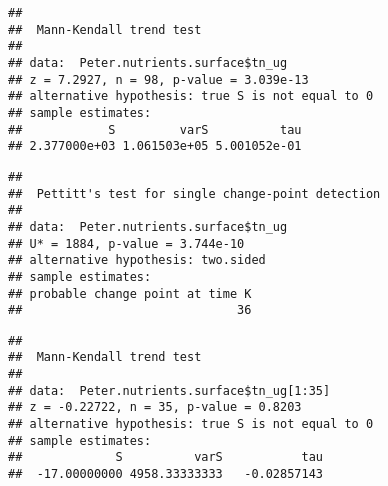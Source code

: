 \documentclass[]{article}
\newenvironment{Shaded}{\begin{snugshade}}{\end{snugshade}}
\newcommand{\KeywordTok}[1]{\textcolor[rgb]{0.13,0.29,0.53}{\textbf{#1}}}
\newcommand{\DecValTok}[1]{\textcolor[rgb]{0.00,0.00,0.81}{#1}}
\newcommand{\CommentTok}[1]{\textcolor[rgb]{0.56,0.35,0.01}{\textit{#1}}}
\newcommand{\OperatorTok}[1]{\textcolor[rgb]{0.81,0.36,0.00}{\textbf{#1}}}
\newcommand{\NormalTok}[1]{#1}
\begin{document}
\begin{verbatim}
## 
##  Mann-Kendall trend test
## 
## data:  Peter.nutrients.surface$tn_ug
## z = 7.2927, n = 98, p-value = 3.039e-13
## alternative hypothesis: true S is not equal to 0
## sample estimates:
##            S         varS          tau 
## 2.377000e+03 1.061503e+05 5.001052e-01
\end{verbatim}

\begin{Shaded}
\end{Shaded}

\begin{verbatim}
## 
##  Pettitt's test for single change-point detection
## 
## data:  Peter.nutrients.surface$tn_ug
## U* = 1884, p-value = 3.744e-10
## alternative hypothesis: two.sided
## sample estimates:
## probable change point at time K 
##                              36
\end{verbatim}

\begin{Shaded}
\end{Shaded}

\begin{verbatim}
## 
##  Mann-Kendall trend test
## 
## data:  Peter.nutrients.surface$tn_ug[1:35]
## z = -0.22722, n = 35, p-value = 0.8203
## alternative hypothesis: true S is not equal to 0
## sample estimates:
##             S          varS           tau 
##  -17.00000000 4958.33333333   -0.02857143
\end{verbatim}

\begin{Shaded}
\end{Shaded}
\end{document}
